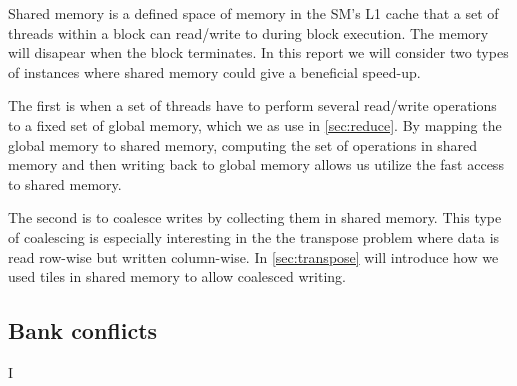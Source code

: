 Shared memory is a defined space of memory in the SM's L1 cache that a set of threads within a block can read/write to during block execution.
The memory will disapear when the block terminates.
In this report we will consider two types of instances where shared memory could give a beneficial speed-up.

The first is when a set of threads have to perform several read/write operations to a fixed set of global memory, which we as use in \cref{sec:reduce}.
By mapping the global memory to shared memory, computing the set of operations in shared memory and then writing back to global memory allows us utilize the fast access to shared memory.

The second is to coalesce writes by collecting them in shared memory.
This type of coalescing is especially interesting in the the transpose problem where data is read row-wise but written column-wise. 
In \cref{sec:transpose} will introduce how we used tiles in shared memory to allow coalesced writing.
\subsection{Bank conflicts}
\label{sec:bank conflicts}
I
